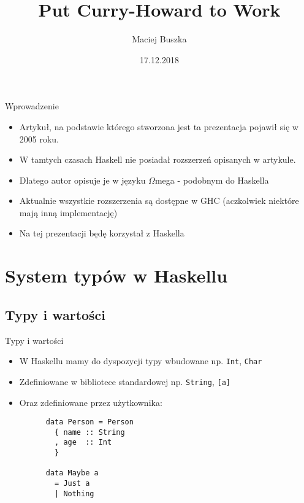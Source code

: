 \documentclass{beamer}
\title[Put Curry-Howard to Work]{Put Curry-Howard to Work}
\author{Maciej Buszka}
\institute{Instytut Informatyki UWr}
\date{17.12.2018}
\begin{document}
\begin{frame}
	\titlepage
\end{frame}

\begin{frame}{Wprowadzenie}
  \begin{itemize}
    \item Artykuł, na podstawie którego stworzona jest ta prezentacja pojawił się w 2005 roku.
    \item W tamtych czasach Haskell nie posiadał rozszerzeń opisanych w artykule.
    \item Dlatego autor opisuje je w języku $\Omega$mega - podobnym do Haskella
    \item Aktualnie wszystkie rozszerzenia są dostępne w GHC (aczkolwiek niektóre mają inną implementację)
    \item Na tej prezentacji będę korzystał z Haskella
  \end{itemize}
\end{frame}

\section{System typów w Haskellu}
\subsection{Typy i wartości}
\begin{frame}[fragile]{Typy i wartości}
  \begin{itemize}
    \item W Haskellu mamy do dyspozycji typy wbudowane np. \lstinline!Int!, \lstinline!Char!
    \item Zdefiniowane w bibliotece standardowej np. \lstinline!String!, \lstinline![a]!
    \item Oraz zdefiniowane przez użytkownika:\\ \begin{lstlisting}
      data Person = Person 
        { name :: String
        , age  :: Int
        }
  
      data Maybe a 
        = Just a
        | Nothing
    \end{lstlisting}
  \end{itemize}
\end{frame}
\end{document}
